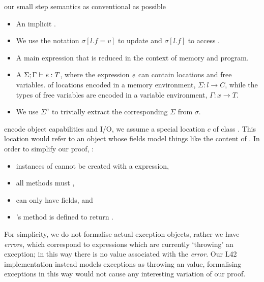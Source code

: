  our small step semantics as conventional as possible
\begin{itemize}
	\item An implicit .
	\item {}
	We use the notation $\sigma[l.f=v]$ to update  and $\sigma[l.f]$ to access .
	\item A main expression that is reduced in the context of memory and program.
	\item A  $\Sigma;\Gamma\vdash{\ensuremath{\mathit{e}}}:T$, where 
	the expression ${\mathit{e}}$ can contain locations and free variables.  of locations  encoded in 
a memory environment, 
$\Sigma : l\rightarrow C$,
	while the types of free variables are encoded in
a variable environment, $\Gamma : x\rightarrow T$.
	\item We use $\Sigma^\sigma$ to trivially extract the corresponding $\Sigma$ from  $\sigma$.
\end{itemize}
 encode object capabilities and I/O, we assume a special location  $c$ of class \Q@Cap@. This location would refer to an object whose fields model things like the content of . In order to simplify our proof, :
\begin{itemize}
	\item instances of \Q@Cap@ cannot be created with a \Q@new@ expression,
	\item all methods  must ,
	\item \Q@Cap@ can only have \Q@mut@ fields, and
	\item \Q@Cap@'s \Q@invariant@ method is defined to return \Q@true@.
\end{itemize}
For simplicity, we do not formalise actual exception objects, rather we have \emph{error}s, which correspond to expressions which are currently  `throwing' an exception; 
in this way there is no value associated with the \emph{error}.
Our L42 implementation instead models exceptions as throwing an \Q@imm@ value, formalising exceptions in this way would not cause any interesting variation of our proof.

